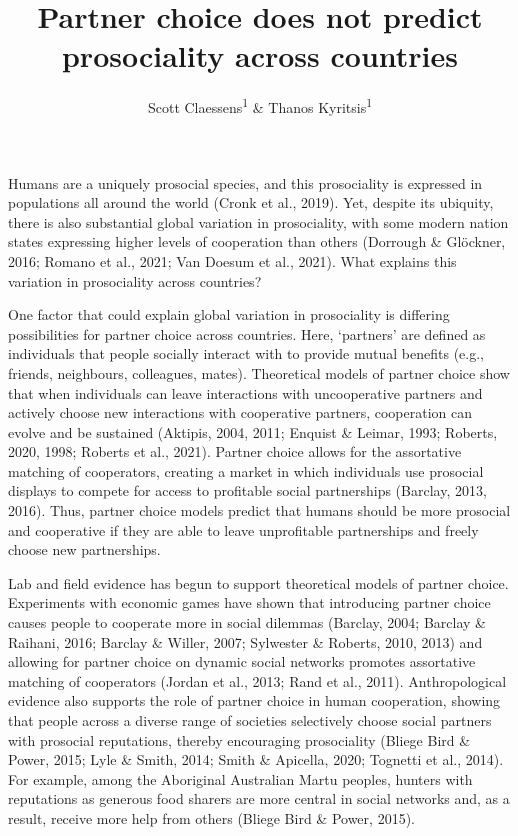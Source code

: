 \documentclass[
  man,floatsintext]{apa6}
\title{Partner choice does not predict prosociality across countries}
\author{Scott Claessens\textsuperscript{1} \& Thanos Kyritsis\textsuperscript{1}}
\date{}
\affiliation{\vspace{0.5cm}\textsuperscript{1} School of Psychology, University of Auckland, Auckland, New Zealand}
\begin{document}
\maketitle

Humans are a uniquely prosocial species, and this prosociality is expressed in populations all around the world (Cronk et al., 2019). Yet, despite its ubiquity, there is also substantial global variation in prosociality, with some modern nation states expressing higher levels of cooperation than others (Dorrough \& Glöckner, 2016; Romano et al., 2021; Van Doesum et al., 2021). What explains this variation in prosociality across countries?

One factor that could explain global variation in prosociality is differing possibilities for partner choice across countries. Here, `partners' are defined as individuals that people socially interact with to provide mutual benefits (e.g., friends, neighbours, colleagues, mates). Theoretical models of partner choice show that when individuals can leave interactions with uncooperative partners and actively choose new interactions with cooperative partners, cooperation can evolve and be sustained (Aktipis, 2004, 2011; Enquist \& Leimar, 1993; Roberts, 2020, 1998; Roberts et al., 2021). Partner choice allows for the assortative matching of cooperators, creating a market in which individuals use prosocial displays to compete for access to profitable social partnerships (Barclay, 2013, 2016). Thus, partner choice models predict that humans should be more prosocial and cooperative if they are able to leave unprofitable partnerships and freely choose new partnerships.

Lab and field evidence has begun to support theoretical models of partner choice. Experiments with economic games have shown that introducing partner choice causes people to cooperate more in social dilemmas (Barclay, 2004; Barclay \& Raihani, 2016; Barclay \& Willer, 2007; Sylwester \& Roberts, 2010, 2013) and allowing for partner choice on dynamic social networks promotes assortative matching of cooperators (Jordan et al., 2013; Rand et al., 2011). Anthropological evidence also supports the role of partner choice in human cooperation, showing that people across a diverse range of societies selectively choose social partners with prosocial reputations, thereby encouraging prosociality (Bliege Bird \& Power, 2015; Lyle \& Smith, 2014; Smith \& Apicella, 2020; Tognetti et al., 2014). For example, among the Aboriginal Australian Martu peoples, hunters with reputations as generous food sharers are more central in social networks and, as a result, receive more help from others (Bliege Bird \& Power, 2015).
\end{document}
